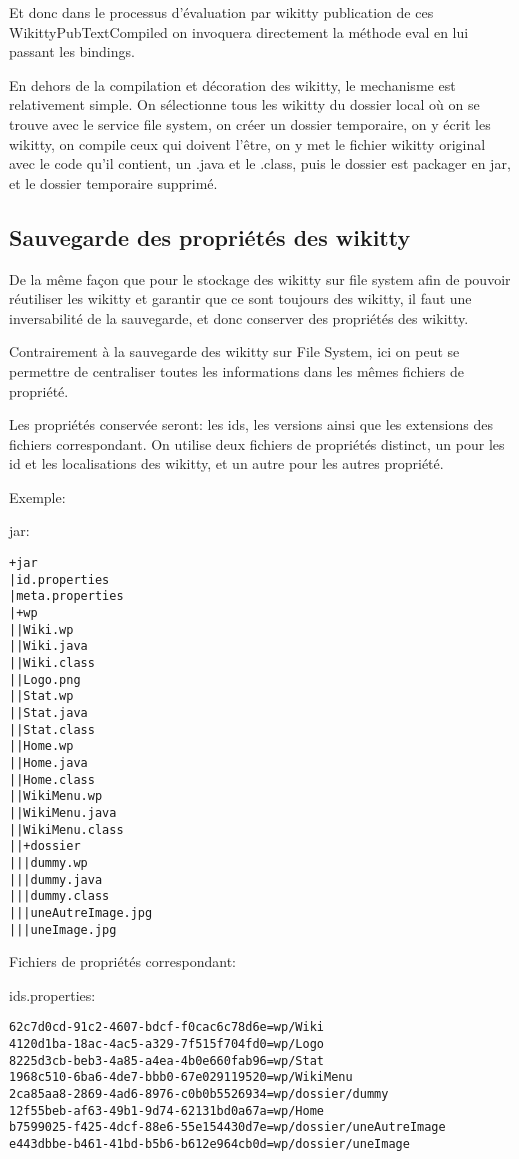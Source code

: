 
Et donc dans le processus d'évaluation par wikitty publication de ces 
WikittyPubTextCompiled on invoquera directement la méthode eval en lui passant
les bindings.

En dehors de la compilation et décoration des wikitty, le mechanisme est 
relativement simple. On sélectionne tous les wikitty du dossier local où on
se trouve avec le service file system, on créer un dossier temporaire, 
on y écrit les wikitty, on compile ceux qui doivent l'être, on y met le fichier
wikitty original avec le code qu'il contient, un .java et le .class, puis le 
dossier est packager en jar, et le dossier temporaire supprimé.


\subsection{Sauvegarde des propriétés des wikitty}

De la même façon que pour le stockage des wikitty sur file system afin de 
pouvoir réutiliser les wikitty et garantir que ce sont toujours des wikitty,
il faut une inversabilité de la sauvegarde, et donc conserver des propriétés des
wikitty.

Contrairement à la sauvegarde des wikitty sur File System, ici on peut se 
permettre de centraliser toutes les informations dans les mêmes fichiers de 
propriété. 

Les propriétés conservée seront: les ids, les versions ainsi que les extensions
des fichiers correspondant. On utilise deux fichiers de propriétés distinct, 
un pour les id et les localisations des wikitty, et un autre pour les autres 
propriété.

Exemple: %

jar:
\begin{verbatim}
+jar
|id.properties
|meta.properties
|+wp
||Wiki.wp
||Wiki.java
||Wiki.class
||Logo.png
||Stat.wp
||Stat.java
||Stat.class
||Home.wp
||Home.java
||Home.class
||WikiMenu.wp
||WikiMenu.java
||WikiMenu.class
||+dossier
|||dummy.wp
|||dummy.java
|||dummy.class
|||uneAutreImage.jpg
|||uneImage.jpg
\end{verbatim}

Fichiers de propriétés correspondant:


ids.properties:
\begin{verbatim}
62c7d0cd-91c2-4607-bdcf-f0cac6c78d6e=wp/Wiki
4120d1ba-18ac-4ac5-a329-7f515f704fd0=wp/Logo
8225d3cb-beb3-4a85-a4ea-4b0e660fab96=wp/Stat
1968c510-6ba6-4de7-bbb0-67e029119520=wp/WikiMenu
2ca85aa8-2869-4ad6-8976-c0b0b5526934=wp/dossier/dummy
12f55beb-af63-49b1-9d74-62131bd0a67a=wp/Home
b7599025-f425-4dcf-88e6-55e154430d7e=wp/dossier/uneAutreImage
e443dbbe-b461-41bd-b5b6-b612e964cb0d=wp/dossier/uneImage
\end{verbatim}


